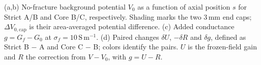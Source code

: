 (a,b) No-fracture background potential $V_0$ as a function of axial position $s$ for Strict A/B and Core B/C, respectively. Shading marks the two $3\,\mathrm{mm}$ end caps; $\Delta V_{0,\mathrm{cap}}$ is their area-averaged potential difference. (c) Added conductance $g=G_f-G_0$ at $\sigma_f=10\,\mathrm{S\,m^{-1}}$. (d) Paired changes $\delta U$, $-\delta R$ and $\delta g$, defined as Strict B $-$ A and Core C $-$ B; colors identify the pairs. $U$ is the frozen-field gain and $R$ the correction from $V-V_0$, with $g=U-R$.

